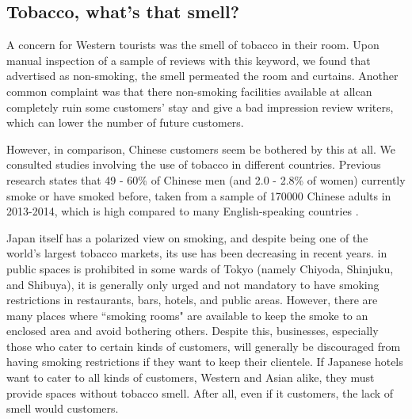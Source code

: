 \subsection{Tobacco, what's that smell?}\label{disc:tobacco}

A \DIFdelbegin {}\DIFdelend concern for Western tourists was the smell of tobacco in their room. Upon manual inspection of a sample of reviews with this keyword, we found that \DIFdelbegin {}\DIFdelend \DIFaddbegin {}\DIFaddend advertised as non-smoking, \DIFdelbegin {}\DIFdelend \DIFaddbegin {}\DIFaddend the smell permeated the room and curtains. Another common complaint was that there \DIFdelbegin {}\DIFdelend \DIFaddbegin {}\DIFaddend non-smoking facilities available at all\DIFdelbegin {}\DIFdelend \DIFaddbegin {}\DIFaddend can completely ruin some customers' stay \DIFdelbegin \DIFdel{, }\DIFdelend and give a bad impression \DIFdelbegin {}\DIFdelend \DIFaddbegin {}\DIFaddend review writers, which can lower the number of future customers. 

However, in comparison, Chinese customers seem \DIFdelbegin {}\DIFdelend \DIFaddbegin {}\DIFaddend be bothered by this at all. We consulted studies involving the use of tobacco in different countries. Previous research states that 49 - 60\% of Chinese men (and 2.0 - 2.8\% of women) currently smoke or have smoked before, taken from a sample of \num[group-separator={,}]{170000} Chinese adults in 2013-2014, which is high compared to many English-speaking countries \cite[][]{zhang2019tobacco, who2015tobacco}.

Japan itself has a polarized view on smoking, and despite being one of the world's largest tobacco markets, its use has been decreasing in recent years. \DIFdelbegin {}\DIFdelend \DIFaddbegin {}\DIFaddend in public spaces is prohibited in some wards of Tokyo (namely Chiyoda, Shinjuku, and Shibuya)\DIFaddbegin {}\DIFaddend , it is generally only urged and not mandatory to have smoking restrictions in restaurants, bars, hotels, and public areas. However, there are many places where ``smoking rooms" are available to keep the smoke to an enclosed area and avoid bothering others. Despite this, businesses, especially those who cater to certain kinds of customers, will generally be discouraged from having smoking restrictions if they want to keep their clientele. If Japanese hotels want to cater to all kinds of customers, Western and Asian alike, they must provide spaces without tobacco smell. After all, even if it \DIFdelbegin {}\DIFdelend \DIFaddbegin {}\DIFaddend customers, the lack of smell would \DIFdelbegin {}\DIFdelend \DIFaddbegin {}\DIFaddend customers. 
